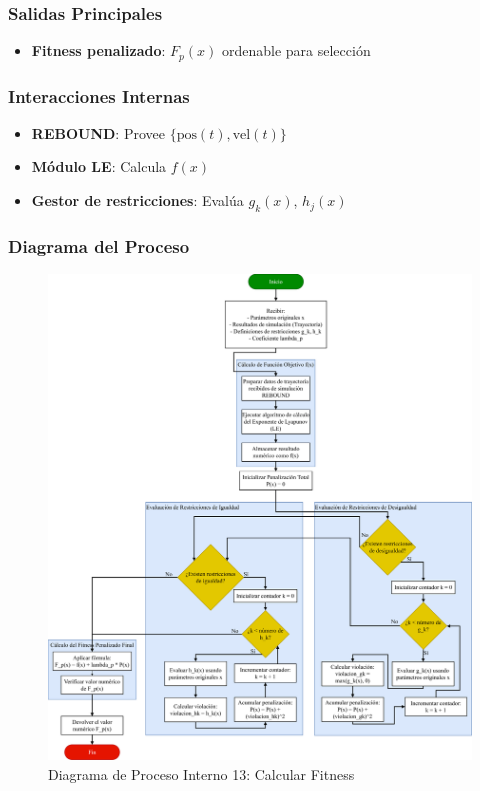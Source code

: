 \subsubsection{Salidas Principales}
\begin{itemize}
    \item \textbf{Fitness penalizado}: $F_p(x)$ ordenable para selección
\end{itemize}

\subsubsection{Interacciones Internas}
\begin{itemize}
    \item \textbf{REBOUND}: Provee $\{\text{pos}(t), \text{vel}(t)\}$
    \item \textbf{Módulo LE}: Calcula $f(x)$
    \item \textbf{Gestor de restricciones}: Evalúa $g_k(x)$, $h_j(x)$
\end{itemize}

\subsubsection{Diagrama del Proceso}
\begin{figure}[H]
    \centering
    \includegraphics[width=\textwidth]{img/Analisis/DiagramaProcesos/DiagramaProceso13_CalcularFitness.png}
    \caption{Diagrama de Proceso Interno 13: Calcular Fitness}%
    \label{fig:process_diagram13}
\end{figure}
